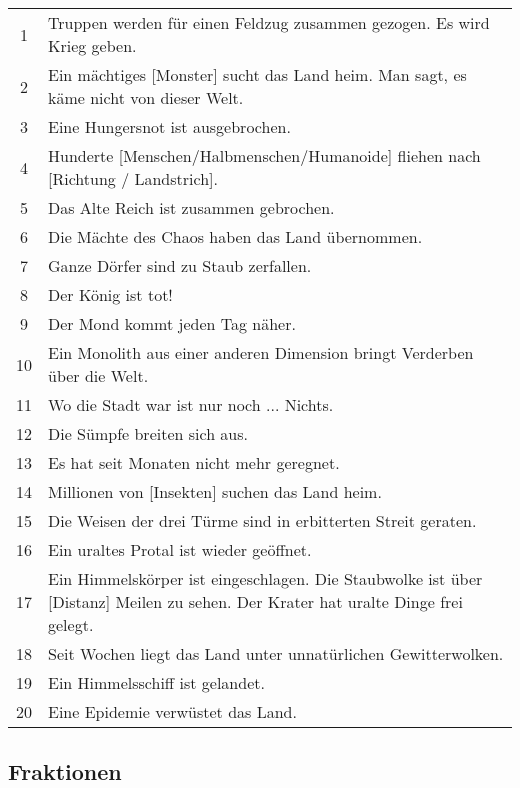 \begin{tabularx}{\columnwidth}{cZ}
1 & Truppen werden für einen Feldzug zusammen gezogen. Es wird Krieg
geben.\\
2 & Ein mächtiges [Monster] sucht das Land heim. Man sagt, es käme
nicht von dieser Welt.\\
3 & Eine Hungersnot ist ausgebrochen.\\
4 & Hunderte [Menschen/Halbmenschen/Humanoide] fliehen nach
[Richtung / Landstrich].\\
5 & Das Alte Reich ist zusammen gebrochen.\\
6 & Die Mächte des Chaos haben das Land übernommen.\\
7 & Ganze Dörfer sind zu Staub zerfallen.\\
8 & Der König ist tot!\\
9 & Der Mond kommt jeden Tag näher.\\
10 & Ein Monolith aus einer anderen Dimension bringt Verderben über
die Welt.\\
11 & Wo die Stadt war ist nur noch ... Nichts.\\
12 & Die Sümpfe breiten sich aus.\\
13 & Es hat seit Monaten nicht mehr geregnet.\\
14 & Millionen von [Insekten] suchen das Land heim.\\
15 & Die Weisen der drei Türme sind in erbitterten Streit geraten.\\
16 & Ein uraltes Protal ist wieder geöffnet.\\
17 & Ein Himmelskörper ist eingeschlagen. Die Staubwolke ist über [Distanz] Meilen zu
sehen. Der Krater hat uralte Dinge frei gelegt.\\
18 & Seit Wochen liegt das Land unter unnatürlichen
Gewitterwolken.\\
19 & Ein Himmelsschiff ist gelandet.\\
20 & Eine Epidemie verwüstet das Land.\\
\end{tabularx}

\subsection{Fraktionen}

